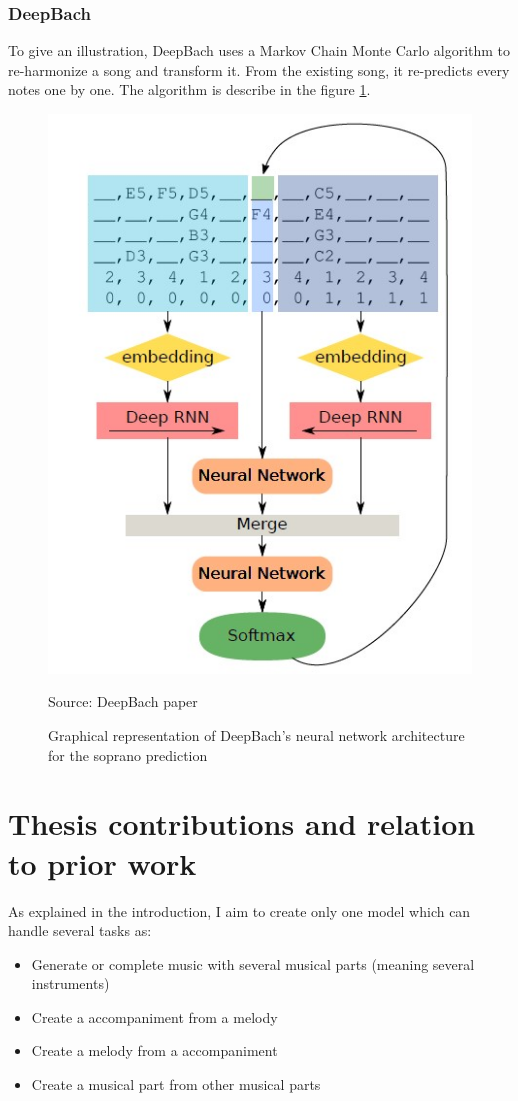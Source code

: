 \documentclass[12pt]{report}
\begin{document}
\subsubsection{DeepBach}

To give an illustration, DeepBach \cite{hadjeres_deepbach:_2016} uses a Markov Chain Monte Carlo algorithm to re-harmonize a song and transform it. 
From the existing song, it re-predicts every notes one by one.
The algorithm is describe in the figure \ref{fig:relatedworks:deepbach_architecture}.

\begin{figure}[htbp]
     \centering
     \includegraphics[width=.5\linewidth]{images/related_works/deepbach/deepbach_algo.jpg}
     \caption{Graphical representation of DeepBach's neural network architecture for the soprano prediction}
     Source: DeepBach paper \cite{hadjeres_deepbach:_2016}
     \label{fig:relatedworks:deepbach_architecture}
\end{figure}

\section{Thesis contributions and relation to prior work}

As explained in the introduction, I aim to create only one model which can handle several tasks as:
\begin{itemize}
    \item Generate or complete music with several musical parts (meaning several instruments)
    \item Create a accompaniment from a melody
    \item Create a melody from a accompaniment
    \item Create a musical part from other musical parts
\end{itemize}
\end{document}

